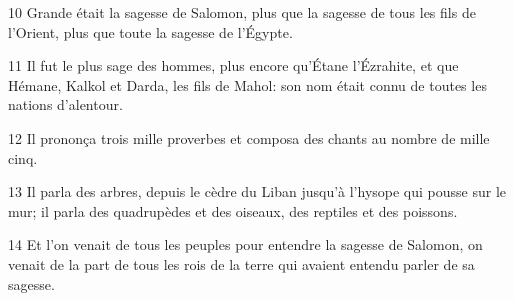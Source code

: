 
10 Grande était la sagesse de Salomon, plus que la sagesse de tous les fils de l’Orient, plus que toute la sagesse de l’Égypte.

11 Il fut le plus sage des hommes, plus encore qu’Étane l’Ézrahite, et que Hémane, Kalkol et Darda, les fils de Mahol: son nom était connu de toutes les nations d’alentour.

12 Il prononça trois mille proverbes et composa des chants au nombre de mille cinq.

13 Il parla des arbres, depuis le cèdre du Liban jusqu’à l’hysope qui pousse sur le mur; il parla des quadrupèdes et des oiseaux, des reptiles et des poissons.

14 Et l’on venait de tous les peuples pour entendre la sagesse de Salomon, on venait de la part de tous les rois de la terre qui avaient entendu parler de sa sagesse.
